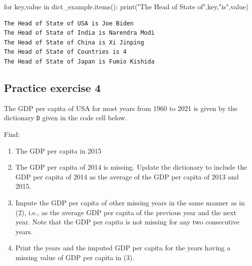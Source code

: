 \documentclass[
  letterpaper,
  DIV=11,
  numbers=noendperiod]{scrreprt}
\newenvironment{Shaded}{\begin{snugshade}}{\end{snugshade}}
\newcommand{\BuiltInTok}[1]{\textcolor[rgb]{0.00,0.23,0.31}{#1}}
\newcommand{\ControlFlowTok}[1]{\textcolor[rgb]{0.00,0.23,0.31}{#1}}
\newcommand{\KeywordTok}[1]{\textcolor[rgb]{0.00,0.23,0.31}{#1}}
\newcommand{\NormalTok}[1]{\textcolor[rgb]{0.00,0.23,0.31}{#1}}
\newcommand{\StringTok}[1]{\textcolor[rgb]{0.13,0.47,0.30}{#1}}
\providecommand{\tightlist}{%
  \setlength{\itemsep}{0pt}\setlength{\parskip}{0pt}}\usepackage{longtable,booktabs,array}
\begin{document}
\begin{Shaded}
\begin{Highlighting}[]
\ControlFlowTok{for}\NormalTok{ key,value }\KeywordTok{in}\NormalTok{ dict\_example.items():}
    \BuiltInTok{print}\NormalTok{(}\StringTok{"The Head of State of"}\NormalTok{,key,}\StringTok{"is"}\NormalTok{,value)}
\end{Highlighting}
\end{Shaded}

\begin{verbatim}
The Head of State of USA is Joe Biden
The Head of State of India is Narendra Modi
The Head of State of China is Xi Jinping
The Head of State of Countries is 4
The Head of State of Japan is Fumio Kishida
\end{verbatim}

\hypertarget{practice-exercise-4}{%
\subsection{Practice exercise 4}\label{practice-exercise-4}}

The GDP per capita of USA for most years from 1960 to 2021 is given by
the dictionary \texttt{D} given in the code cell below.

Find:

\begin{enumerate}
\def\labelenumi{\arabic{enumi}.}
\tightlist
\item
  The GDP per capita in 2015
\item
  The GDP per capita of 2014 is missing. Update the dictionary to
  include the GDP per capita of 2014 as the average of the GDP per
  capita of 2013 and 2015.
\item
  Impute the GDP per capita of other missing years in the same manner as
  in (2), i.e., as the average GDP per capita of the previous year and
  the next year. Note that the GDP per capita is not missing for any two
  consecutive years.
\item
  Print the years and the imputed GDP per capita for the years having a
  missing value of GDP per capita in (3).
\end{enumerate}
\end{document}
